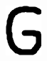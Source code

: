\documentclass[russian,utf8,emptystyle]{eskdtext}
\begin{document}
\begin{figure}[!htb]
\includegraphics[width=\linewidth]{../data/learn/g/001}
\endminipage\hfill
{}

\end{figure}
\end{document}
